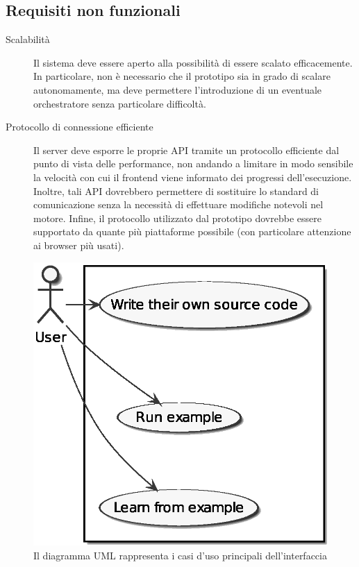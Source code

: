     \subsection{Requisiti non funzionali}

    \begin{description}
      \item[Scalabilità]
        Il sistema deve essere aperto alla possibilità di essere scalato efficacemente.
        In particolare, non è necessario che il prototipo sia in grado di scalare autonomamente, ma deve permettere l'introduzione di un eventuale orchestratore senza particolare difficoltà.
      \item[Protocollo di connessione efficiente]
        Il server deve esporre le proprie API tramite un protocollo efficiente dal punto di vista delle performance, non andando a limitare in modo sensibile la velocità con cui il frontend viene informato dei progressi dell'esecuzione.
        Inoltre, tali API dovrebbero permettere di sostituire lo standard di comunicazione senza la necessità di effettuare modifiche notevoli nel motore.
        Infine, il protocollo utilizzato dal prototipo dovrebbe essere supportato da quante più piattaforme possibile (con particolare attenzione ai browser più usati).
    \end{description}


    \begin{figure}[htbp]
      \centering
      \includegraphics[width=.6\textwidth]{res/uml/use-cases-frontend.eps}%
      \caption{Il diagramma UML rappresenta i casi d'uso principali dell'interfaccia}%
      \label{fig:uml-use-case}
    \end{figure}
